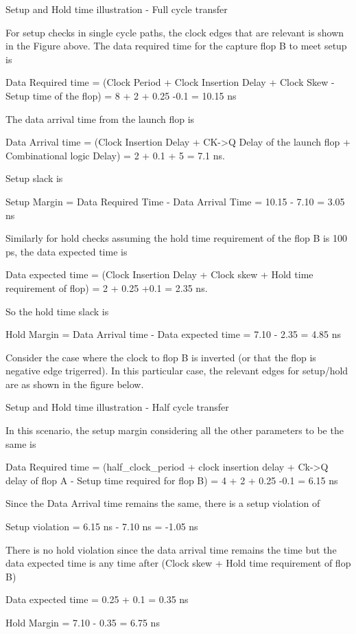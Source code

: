 Setup and Hold time illustration - Full cycle transfer

For setup checks in single cycle paths, the clock edges that are relevant is shown in the Figure above. The data required time for the capture flop B to meet setup is

Data Required time = (Clock Period + Clock Insertion Delay + Clock Skew - Setup time of the flop) = 8 + 2 + 0.25 -0.1 = 10.15 ns

The data arrival time from the launch flop is

Data Arrival time = (Clock Insertion Delay + CK->Q Delay of the launch flop + Combinational logic Delay) = 2 + 0.1 + 5 = 7.1 ns.

Setup slack is

Setup Margin = Data Required Time - Data Arrival Time = 10.15 - 7.10 = 3.05 ns



Similarly for hold checks assuming the hold time requirement of the flop B is 100 ps, the data expected time is

Data expected time = (Clock Insertion Delay + Clock skew + Hold time requirement of flop) = 2 + 0.25 +0.1 = 2.35 ns.

So the hold time slack is

Hold Margin = Data Arrival time - Data expected time = 7.10 - 2.35 = 4.85 ns

Consider the case where the clock to flop B is inverted (or that the flop is negative edge trigerred). In this particular case, the relevant edges for setup/hold are as shown in the figure below.



Setup and Hold time illustration - Half cycle transfer



In this scenario, the setup margin considering all the other parameters to be the same is

Data Required time = (half_clock_period + clock insertion delay + Ck->Q delay of flop A - Setup time required for flop B) = 4 + 2 + 0.25 -0.1 = 6.15 ns

Since the Data Arrival time remains the same, there is a setup violation of

Setup violation = 6.15 ns - 7.10 ns = -1.05 ns

There is no hold violation since the data arrival time remains the time but the data expected time is any time after (Clock skew + Hold time requirement of flop B)

Data expected time = 0.25 + 0.1 = 0.35 ns

Hold Margin = 7.10 - 0.35 = 6.75 ns

